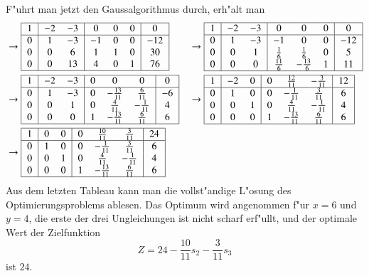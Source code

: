 F"uhrt man jetzt den Gaussalgorithmus durch, erh"alt man
\begin{align*}
&\rightarrow
\begin{tabular}{|>{$}c<{$}|>{$}c<{$}>{$}c<{$}|>{$}c<{$}>{$}c<{$}>{$}c<{$}|>{$}c<{$}|}
\hline
 1&-2&-3& 0& 0& 0&  0\\
\hline
 0& 1&-3&-1& 0& 0&-12\\
 0& 0& 6& 1& 1& 0& 30\\
 0& 0&13& 4& 0& 1& 76\\
\hline
\end{tabular}
&&\rightarrow
\begin{tabular}{|>{$}c<{$}|>{$}c<{$}>{$}c<{$}|>{$}c<{$}>{$}c<{$}>{$}c<{$}|>{$}c<{$}|}
\hline
 1&-2&-3&      0    &      0    & 0&  0\\
\hline
 0& 1&-3&     -1    &      0    & 0&-12\\
 0& 0& 1&\frac16    &\frac16    & 0&  5\\
 0& 0& 0&\frac{11}6 &-\frac{13}6& 1& 11\\
\hline
\end{tabular}
\\
&\rightarrow
\begin{tabular}{|>{$}c<{$}|>{$}c<{$}>{$}c<{$}|>{$}c<{$}>{$}c<{$}>{$}c<{$}|>{$}c<{$}|}
\hline
 1&-2&-3&          0&             0&            0&  0\\
\hline
 0& 1&-3&          0&-\frac{13}{11}& \frac{6}{11}& -6\\
 0& 0& 1&          0&  \frac{4}{11}&-\frac{1}{11}&  4\\
 0& 0& 0&          1&-\frac{13}{11}& \frac{6}{11}&  6\\
\hline
\end{tabular}
&&\rightarrow
\begin{tabular}{|>{$}c<{$}|>{$}c<{$}>{$}c<{$}|>{$}c<{$}>{$}c<{$}>{$}c<{$}|>{$}c<{$}|}
\hline
 1&-2& 0&          0& \frac{12}{11}&-\frac{3}{11}& 12\\
\hline
 0& 1& 0&          0& -\frac{1}{11}& \frac{3}{11}&  6\\
 0& 0& 1&          0&  \frac{4}{11}&-\frac{1}{11}&  4\\
 0& 0& 0&          1&-\frac{13}{11}& \frac{6}{11}&  6\\
\hline
\end{tabular}
\\
&\rightarrow
\begin{tabular}{|>{$}c<{$}|>{$}c<{$}>{$}c<{$}|>{$}c<{$}>{$}c<{$}>{$}c<{$}|>{$}c<{$}|}
\hline
 1& 0& 0&          0& \frac{10}{11}& \frac{3}{11}& 24\\
\hline
 0& 1& 0&          0& -\frac{1}{11}& \frac{3}{11}&  6\\
 0& 0& 1&          0&  \frac{4}{11}&-\frac{1}{11}&  4\\
 0& 0& 0&          1&-\frac{13}{11}& \frac{6}{11}&  6\\
\hline
\end{tabular}
\end{align*}
Aus dem letzten Tableau kann man die vollst"andige L"osung
des Optimierungsproblems ablesen. Das Optimum wird angenommen
f"ur $x=6$ und $y=4$, die erste der drei Ungleichungen ist
nicht scharf erf"ullt, und der optimale Wert der Zielfunktion
\[
Z=24-\frac{10}{11}s_2-\frac{3}{11}s_3
\]
ist $24$.

